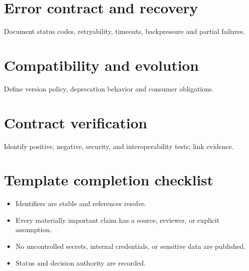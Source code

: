 \documentclass[10pt,letterpaper]{article}
\begin{document}
\section{Error contract and recovery}
Document status codes, retryability, timeouts, backpressure and partial failures.

\section{Compatibility and evolution}
Define version policy, deprecation behavior and consumer obligations.

\section{Contract verification}
Identify positive, negative, security, and interoperability tests; link evidence.

\section{Template completion checklist}
\begin{itemize}
\item Identifiers are stable and references resolve.
\item Every materially important claim has a source, reviewer, or explicit assumption.
\item No uncontrolled secrets, internal credentials, or sensitive data are published.
\item Status and decision authority are recorded.
\end{itemize}
\end{document}
